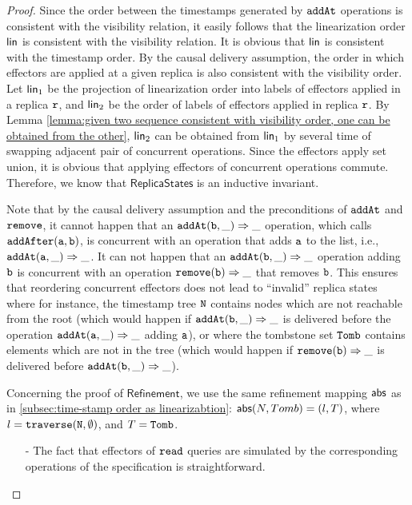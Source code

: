 \begin {proof}

Since the order between the timestamps generated by ${\tt addAt}$ operations is consistent with the visibility relation, it easily follows that the linearization order $\mathsf{lin}$ is consistent with the visibility relation. It is obvious that $\mathsf{lin}$ is consistent with the timestamp order. By the causal delivery assumption, the order in which effectors are applied at a given replica is also consistent with the visibility order. Let $\mathsf{lin}_1$ be the projection of linearization order into labels of effectors applied in a replica $\mathtt{r}$, and $\mathsf{lin}_2$ be the order of labels of effectors applied in replica $\mathtt{r}$. By Lemma \ref{lemma:given two sequence consistent with visibility order, one can be obtained from the other}, $\mathsf{lin}_2$ can be obtained from $\mathsf{lin}_1$ by several time of swapping adjacent pair of concurrent operations. Since the effectors apply set union, it is obvious that applying effectors of concurrent operations commute. Therefore, we know that $\mathsf{ReplicaStates}$ is an inductive invariant.

Note that by the causal delivery assumption and the preconditions of ${\tt addAt}$ and ${\tt remove}$, it cannot happen that an $\alabellong[{\tt addAt}]{b,\_}{\_}{}$ operation, which calls $\alabelshort[{\tt addAfter}]{a,b}$, is concurrent with an operation that adds ${\tt a}$ to the list, i.e., $\alabellong[{\tt addAt}]{a,\_}{\_}{}$. It can not happen that an $\alabellong[{\tt addAt}]{b,\_}{\_}{}$ operation adding ${\tt b}$ is concurrent with an operation $\alabellong[{\tt remove}]{b}{\_}{}$ that removes ${\tt b}$. This ensures that reordering
concurrent effectors does not lead to ``invalid'' replica states where for instance, the timestamp tree ${\tt N}$ contains nodes which are not reachable from the root (which would happen if $\alabellong[{\tt addAt}]{b,\_}{\_}{}$ is delivered before the operation $\alabellong[{\tt addAt}]{a,\_}{\_}{}$ adding ${\tt a}$), or where the tombstone set ${\tt Tomb}$ contains elements which are not in the tree (which would happen if $\alabellong[{\tt remove}]{b}{\_}{}$ is delivered before $\alabellong[{\tt addAt}]{b,\_}{\_}{}$).

Concerning the proof of $\mathsf{Refinement}$, we use the same refinement mapping $\mathsf{abs}$ as in \sectionautorefname \ref{subsec:time-stamp order as linearizabtion}: $\mathsf{abs}(N,Tomb) = (l,T)$, where $l={\tt traverse(N, \emptyset)}$, and $T={\tt Tomb}$.

\begin{itemize}
\setlength{\itemsep}{0.5pt}
\item[-] The fact that effectors of ${\tt read}$ queries are simulated by the corresponding operations of the specification is straightforward.


\end{itemize}
\end{proof}
